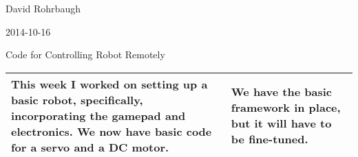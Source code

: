 David Rohrbaugh

2014-10-16

Code for Controlling Robot Remotely

\begin{tabular}{|p{5cm}|p{5cm}|}
 \hline
 This week I worked on setting up a basic robot, specifically, incorporating the gamepad and electronics. We now have basic code for a servo and a DC motor.
 &
 We have the basic framework in place, but it will have to be fine-tuned.
 \\
 \hline
\end{tabular}
